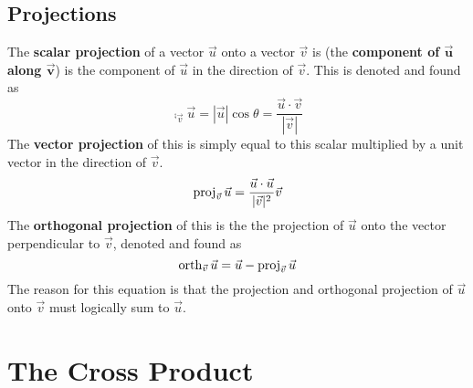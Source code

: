 \documentclass[../Calculus_\Roman{3}]{subfiles}
\begin{document}
			\subsection*{Projections}
				The \textbf{scalar projection} of a vector $\vec{u}$ onto a vector $\vec{v}$ is (the \textbf{component of $\bm{\vec{u}}$ along $\bm{\vec{v}}$}) is the component of $\vec{u}$ in the direction of $\vec{v}$. This is denoted and found as 
					\[\comp_{\vec{v}}\vec{u} = |\vec{u}|\cos\theta = \frac{\vec{u} \cdot \vec{v}}{|\vec{v}|}\]
				The \textbf{vector projection} of this is simply equal to this scalar multiplied by a unit vector in the direction of $\vec{v}$.
					\[\operatorname{proj}_{\vec{v}}\vec{u} = \frac{\vec{u} \cdot\vec{u}}{|\vec{v}|^2}\vec{v}\]
				The \textbf{orthogonal projection} of this is the the projection of $\vec{u}$ onto the vector perpendicular to $\vec{v}$, denoted and found as
					\[\operatorname{orth}_{\vec{v}}\vec{u} = \vec{u} - \operatorname{proj}_{\vec{v}}\vec{u}\]
				The reason for this equation is that the projection and orthogonal projection of $\vec{u}$ onto $\vec{v}$ must logically sum to $\vec{u}$.
		\section{The Cross Product}
\end{document}

